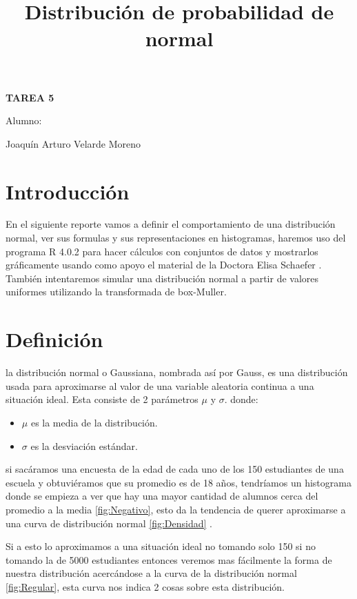 \documentclass[]{article}
\title{Distribución de probabilidad de normal }
\date{}
\begin{document}
	\maketitle
	\begin{center}


\centerline{\textbf{TAREA 5} } 
\textbf{ }

\centerline{Alumno: } 
\centerline{Joaquín Arturo Velarde Moreno}


	\end{center}
	

\section{Introducción}
En el siguiente reporte vamos a definir el comportamiento de una distribución normal, ver sus formulas y sus representaciones en histogramas, haremos uso del programa R 4.0.2 \cite{rproject} para hacer cálculos con conjuntos de datos y mostrarlos gráficamente usando como apoyo el material de la Doctora Elisa Schaefer \cite{rproject}.
También intentaremos simular una distribución normal a partir de valores uniformes utilizando la transformada de box-Muller.
\section{Definición}
la distribución normal o Gaussiana, nombrada así por Gauss, es una distribución usada para aproximarse al valor de una variable aleatoria continua a una situación ideal. Esta consiste de 2 parámetros $\mu$ y $\sigma$.
donde:
\begin{itemize}
	\item $\mu$ es la media de la distribución.
	\item $\sigma$ es la desviación estándar.
\end{itemize}
si sacáramos una encuesta de la edad de cada uno de los 150 estudiantes de una escuela y obtuviéramos que su promedio es de 18 años, tendríamos un histograma donde se empieza a ver que hay una mayor cantidad de alumnos cerca del promedio a la media \autoref{fig:Negativo}, esto da la tendencia de querer aproximarse a una curva de distribución normal \autoref{fig:Densidad} .

Si a esto lo aproximamos a una situación ideal no tomando solo 150 si no tomando la de 5000 estudiantes entonces veremos mas fácilmente la forma de nuestra distribución acercándose a la curva de la distribución normal \autoref{fig:Regular}, esta curva nos indica 2 cosas sobre esta distribución.
\end{document}
